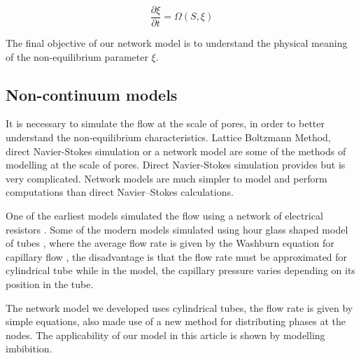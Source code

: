 	\begin{equation}
		\frac{\partial \xi}{\partial t} = \Omega ( S, \xi )
	\end{equation}
	
	The final objective of our network model is to understand the physical meaning of the non-equilibrium parameter $\xi$.
	 
\subsection{Non-continuum models}
	It is necessary to simulate the flow at the scale of pores, in order to better understand the non-equilibrium characteristics. Lattice Boltzmann Method, direct Navier-Stokes simulation or a network model are some of the methods of modelling at the scale of pores. Direct Navier-Stokes simulation provides but is very complicated. Network models are much simpler to model and perform computations than direct Navier–Stokes calculations.
	
	One of the earliest models simulated the flow using a network of electrical resistors \cite{fatt1956network}. Some of the modern models simulated using hour glass shaped model of tubes \cite{aker1998two}, where the average flow rate is given by the Washburn equation for capillary flow \cite{washburn1921dynamics}, the disadvantage is that the flow rate must be approximated for cylindrical tube while in the model, the capillary pressure varies depending on its position in the tube.
	
	The network model we developed uses cylindrical tubes, the flow rate is given by simple equations, also made use of a new method for distributing phases at the nodes. The applicability of our model in this article is shown by modelling imbibition.
